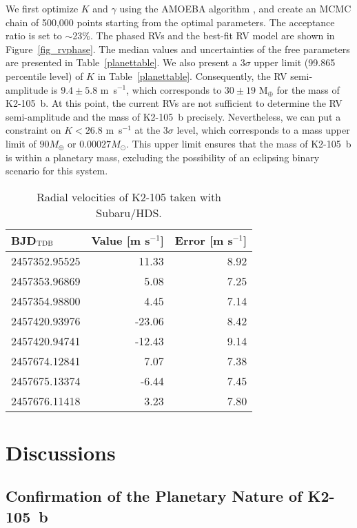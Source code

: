 \documentclass[]{pasj01}
\begin{document}
We first optimize $K$ and $\gamma$ using the AMOEBA algorithm \citep{1992nrca.book.....P},
and create an MCMC chain of 500,000 points starting from the optimal parameters.
The acceptance ratio is set to $\sim$23\%.
The phased RVs and the best-fit RV model are shown in Figure~\ref{fig_rvphase}.
The median values and uncertainties of the free parameters
are presented in Table~\ref{planettable}.
We also present a 3$\sigma$ upper limit (99.865 percentile level) of $K$
in Table~\ref{planettable}.
Consequently, the RV semi-amplitude is $9.4\pm5.8$ m~s$^{-1}$,
which corresponds to $30\pm19$ M$_{\oplus}$ for the mass of K2-105~b.
At this point, the current RVs are not sufficient to determine 
the RV semi-amplitude and the mass of K2-105~b precisely.
Nevertheless, we can put a constraint on $K < 26.8$ m~s$^{-1}$ at the 3$\sigma$ level,
which corresponds to a mass upper limit of $90 M_{\oplus}$ or  $0.00027 M_{\odot}$.
This upper limit ensures that the mass of K2-105~b is within a planetary mass,
excluding the possibility of an eclipsing binary scenario for this system.


\begin{table}[t]
\caption{Radial velocities of K2-105 taken with Subaru/HDS.\label{rvtable}}
\begin{tabular}{lrr}
\hline
BJD$_{\rm TDB}$ & Value [m s$^{-1}$] & Error [m s$^{-1}$]  \\\hline
2457352.95525 & 11.33 & 8.92 \\
2457353.96869 & 5.08   & 7.25 \\
2457354.98800 & 4.45   & 7.14 \\
2457420.93976 & -23.06 & 8.42 \\
2457420.94741 & -12.43 & 9.14 \\
2457674.12841 & 7.07   & 7.38 \\
2457675.13374 & -6.44  & 7.45 \\
2457676.11418 & 3.23   & 7.80 \\
\hline
\end{tabular}
\end{table}

\section{Discussions}

\subsection{Confirmation of the Planetary Nature of K2-105~b}
\end{document}

